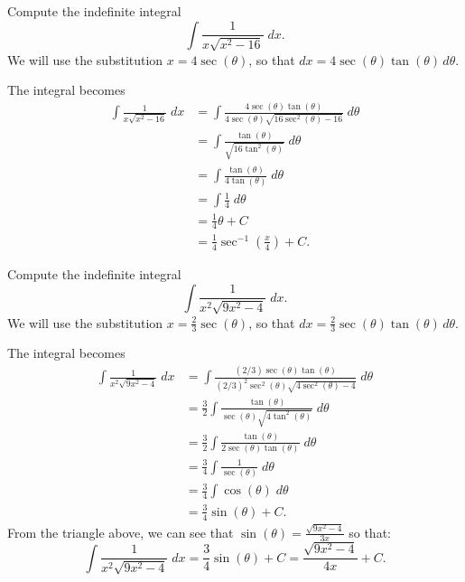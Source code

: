 \documentclass{ximera}
\begin{document}
\begin{example}
Compute the indefinite integral
\[
\int \frac{1}{x\sqrt{x^2-16}} \; dx.
\]
We will use the substitution $x = 4\sec(\theta)$,
so that $dx = 4\sec(\theta)\tan(\theta) \, d\theta$.

The integral becomes
\begin{align*}
\int \frac{1}{x\sqrt{x^2-16}}\; dx &= \int \frac{4\sec(\theta)\tan(\theta)}{4\sec(\theta)\sqrt{16\sec^2(\theta)-16}}\; d\theta\\
                                 &=  \int \frac{\tan(\theta)}{\sqrt{16\tan^2(\theta)}}\; d\theta\\
                                 &=  \int \frac{\tan(\theta)}{4\tan(\theta)}\; d\theta\\
                                  &=  \int \frac14 \; d\theta\\
                                  &= \frac14 \theta + C\\
                                  &= \frac14 \sec^{-1}\left(\frac{x}{4}\right)+C.
\end{align*}

\end{example}



\begin{example}
Compute the indefinite integral
\[
\int \frac{1}{x^2\sqrt{9x^2-4}} \; dx.
\]
We will use the substitution $x = \frac23\sec(\theta)$,
so that $dx = \frac23\sec(\theta)\tan(\theta) \, d\theta$.

The integral becomes
\begin{align*}
\int \frac{1}{x^2\sqrt{9x^2-4}}\; dx &= \int \frac{(2/3)\sec(\theta)\tan(\theta)}{(2/3)^2\sec^2(\theta)\sqrt{4\sec^2(\theta)-4}}\; d\theta\\
                                 &=  \frac32\int \frac{\tan(\theta)}{\sec(\theta)\sqrt{4\tan^2(\theta)}}\; d\theta\\
                                 &=  \frac32\int \frac{\tan(\theta)}{2\sec(\theta)\tan(\theta)}\; d\theta\\
                                  &=  \frac34 \int \frac{1}{\sec(\theta)} \; d\theta\\
                                  &= \frac34 \int \cos(\theta)  \; d\theta\\
                                  &= \frac34 \sin(\theta) + C.
\end{align*}
From the triangle above, we can see that $\sin(\theta) = \frac{\sqrt{9x^2-4}}{3x}$ so that:
\[
\int \frac{1}{x^2\sqrt{9x^2-4}} \; dx =  \frac34 \sin(\theta) + C =  \frac{\sqrt{9x^2 - 4}}{4x} + C.
\]

\end{example}
\end{document}
